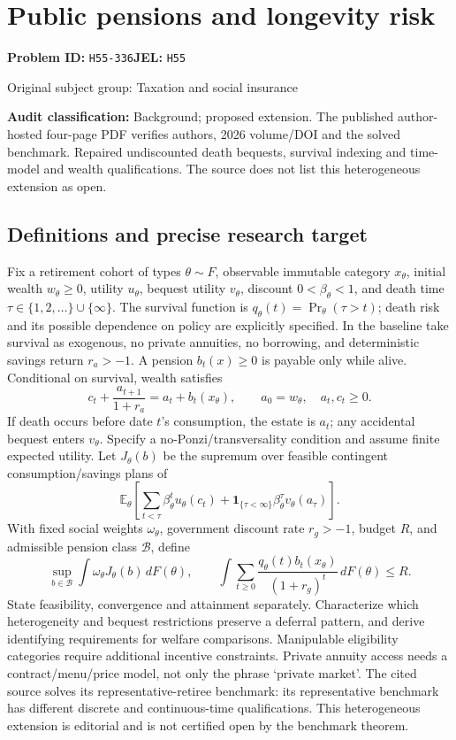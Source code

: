 \documentclass[11pt,a4paper]{article}
\begin{document}
\section*{Public pensions and longevity risk}
\textbf{Problem ID:} \texttt{H55-336}\quad \textbf{JEL:} \texttt{H55}\par
\label{problem:OP-0479}
{\sffamily\small\color{muted}Original subject group: Taxation and social insurance\par}
\label{definitions:problem:30007761}
\textbf{Audit classification:} Background; proposed extension. The published author-hosted four-page PDF verifies authors, 2026 volume/DOI and the solved benchmark. Repaired undiscounted death bequests, survival indexing and time-model and wealth qualifications. The source does not list this heterogeneous extension as open.
\subsection*{Definitions and precise research target}
Fix a retirement cohort of types \(\theta\sim F\), observable immutable category \(x_\theta\), initial wealth \(w_\theta\geq0\), utility \(u_\theta\), bequest utility \(v_\theta\), discount \(0<\beta_\theta<1\), and death time \(\tau\in\{1,2,\ldots\}\cup\{\infty\}\). The survival function is \(q_\theta(t)=\Pr_\theta(\tau>t)\); death risk and its possible dependence on policy are explicitly specified. In the baseline take survival as exogenous, no private annuities, no borrowing, and deterministic savings return \(r_a>-1\). A pension \(b_t(x)\geq0\) is payable only while alive. Conditional on survival, wealth satisfies
\[
 c_t+\frac{a_{t+1}}{1+r_a}=a_t+b_t(x_\theta),\qquad
 a_0=w_\theta,\quad a_t,c_t\geq0.
\]
If death occurs before date \(t\)'s consumption, the estate is \(a_t\); any accidental bequest enters \(v_\theta\). Specify a no-Ponzi/transversality condition and assume finite expected utility. Let \(J_\theta(b)\) be the supremum over feasible contingent consumption/savings plans of
\[
 \mathbb E_\theta\!\left[\sum_{t<\tau}\beta_\theta^tu_\theta(c_t)
 +\mathbf1_{\{\tau<\infty\}}\beta_\theta^\tau v_\theta(a_\tau)\right].
\]
With fixed social weights \(\omega_\theta\), government discount rate \(r_g>-1\), budget \(R\), and admissible pension class \(\mathcal B\), define
\[
 \sup_{b\in\mathcal B}\int\omega_\theta J_\theta(b)\,dF(\theta),\qquad
 \int\sum_{t\geq0}\frac{q_\theta(t)b_t(x_\theta)}{(1+r_g)^t}\,dF(\theta)\leq R.
\]
State feasibility, convergence and attainment separately. Characterize which heterogeneity and bequest restrictions preserve a deferral pattern, and derive identifying requirements for welfare comparisons. Manipulable eligibility categories require additional incentive constraints. Private annuity access needs a contract/menu/price model, not only the phrase `private market'. The cited source solves its representative-retiree benchmark: its representative benchmark has different discrete and continuous-time qualifications. This heterogeneous extension is editorial and is not certified open by the benchmark theorem.
\end{document}
